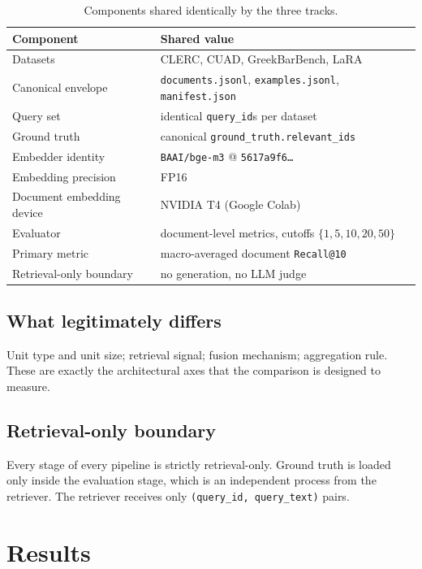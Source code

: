 \documentclass[11pt,a4paper]{article}
\begin{document}
\begin{table}[h]
\centering
\caption{Components shared identically by the three tracks.}
\label{tab:shared}
\small
\begin{tabular}{p{5.0cm} p{10.0cm}}
\toprule
\textbf{Component} & \textbf{Shared value} \\
\midrule
Datasets & CLERC, CUAD, GreekBarBench, LaRA \\
Canonical envelope & \texttt{documents.jsonl},
  \texttt{examples.jsonl}, \texttt{manifest.json} \\
Query set & identical \texttt{query\_id}s per dataset \\
Ground truth & canonical \texttt{ground\_truth.relevant\_ids} \\
Embedder identity & \texttt{BAAI/bge-m3} @ \texttt{5617a9f6\ldots} \\
Embedding precision & FP16 \\
Document embedding device & NVIDIA T4 (Google Colab) \\
Evaluator & document-level metrics, cutoffs $\{1,5,10,20,50\}$ \\
Primary metric & macro-averaged document \texttt{Recall@10} \\
Retrieval-only boundary & no generation, no LLM judge \\
\bottomrule
\end{tabular}
\end{table}

\subsection{What legitimately differs}
Unit type and unit size; retrieval signal; fusion mechanism;
aggregation rule. These are exactly the architectural axes that the
comparison is designed to measure.

\subsection{Retrieval-only boundary}
Every stage of every pipeline is strictly retrieval-only. Ground
truth is loaded only inside the evaluation stage, which is an
independent process from the retriever. The retriever receives only
\texttt{(query\_id, query\_text)} pairs.

\section{Results}\label{sec:results}
\end{document}
